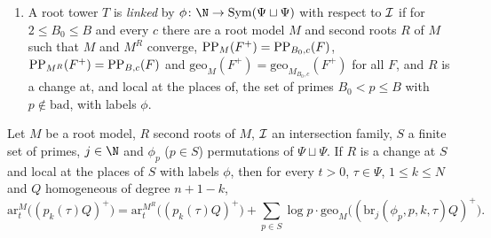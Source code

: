 \begin{definition}
\begin{enumerate}[label=(\alph*)]
\item A root tower $T$ is \emph{linked} by $\phi\colon\N\to\mathrm{Sym}(\Psi\sqcup\Psi)$ with respect to $\mathcal{I}$ if
for $2\le B_0\le B$ and every $c$ there are a root model $M$ and second roots $R$ of $M$ such that $M$ and $M^R$
converge, $\mathrm{PP}_M(F^+)=\mathrm{PP}_{B_0,c}(F)$, $\mathrm{PP}_{M^R}(F^+)=\mathrm{PP}_{B,c}(F)$ and
$\mathrm{geo}_M(F^+)=\mathrm{geo}_{M_{B_0,c}}(F^+)$ for all $F$, and $R$ is a change at, and local at the places of, the
set of primes $B_0<p\le B$ with $p\notin\mathrm{bad}$, with labels $\phi$.
\end{enumerate}
\end{definition}

\begin{proposition}\label{pf:volthm:prop:heightchange}
Let $M$ be a root model, $R$ second roots of $M$, $\mathcal{I}$ an intersection family, $S$ a finite set of primes,
$j\in\N$ and $\phi_p$ ($p\in S$) permutations of $\Psi\sqcup\Psi$. If $R$ is a change at $S$ and local at the places of
$S$ with labels $\phi$, then for every $t>0$, $\tau\in\Psi$, $1\le k\le N$ and $Q$ homogeneous of degree $n+1-k$,
\[
\mathrm{ar}^M_t\bigl((p_k(\tau)Q)^+\bigr)=\mathrm{ar}^{M^R}_t\bigl((p_k(\tau)Q)^+\bigr)+\sum_{p\in S}\log p\cdot
\mathrm{geo}_M\bigl((\mathrm{br}_j(\phi_p,p,k,\tau)Q)^+\bigr).
\]
\end{proposition}

